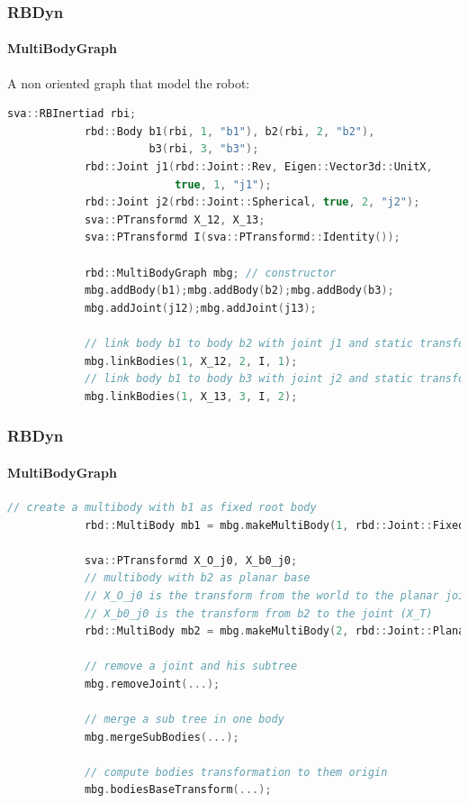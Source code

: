 \documentclass{beamer}
\begin{document}
  	\begin{frame}[fragile]
		\frametitle{RBDyn}
		\framesubtitle{MultiBodyGraph}
		A non oriented graph that model the robot:
		\begin{lstlisting}[language=C++]
			sva::RBInertiad rbi;
			rbd::Body b1(rbi, 1, "b1"), b2(rbi, 2, "b2"),
			          b3(rbi, 3, "b3");
			rbd::Joint j1(rbd::Joint::Rev, Eigen::Vector3d::UnitX,
			              true, 1, "j1");
			rbd::Joint j2(rbd::Joint::Spherical, true, 2, "j2");
			sva::PTransformd X_12, X_13;
			sva::PTransformd I(sva::PTransformd::Identity());

			rbd::MultiBodyGraph mbg; // constructor
			mbg.addBody(b1);mbg.addBody(b2);mbg.addBody(b3);
			mbg.addJoint(j12);mbg.addJoint(j13);

			// link body b1 to body b2 with joint j1 and static transform X_12
			mbg.linkBodies(1, X_12, 2, I, 1);
			// link body b1 to body b3 with joint j2 and static transform X_13
			mbg.linkBodies(1, X_13, 3, I, 2);
		\end{lstlisting}
	\end{frame}
  	\begin{frame}[fragile]
		\frametitle{RBDyn}
		\framesubtitle{MultiBodyGraph}
		\begin{lstlisting}[language=C++]
			// create a multibody with b1 as fixed root body
			rbd::MultiBody mb1 = mbg.makeMultiBody(1, rbd::Joint::Fixed);

			sva::PTransformd X_O_j0, X_b0_j0;
			// multibody with b2 as planar base 
			// X_O_j0 is the transform from the world to the planar joint
			// X_b0_j0 is the transform from b2 to the joint (X_T)
			rbd::MultiBody mb2 = mbg.makeMultiBody(2, rbd::Joint::Planar, X_O_j0, X_b0_j0);

			// remove a joint and his subtree
			mbg.removeJoint(...);

			// merge a sub tree in one body
			mbg.mergeSubBodies(...);

			// compute bodies transformation to them origin
			mbg.bodiesBaseTransform(...);
		\end{lstlisting}
	\end{frame}
\end{document}
